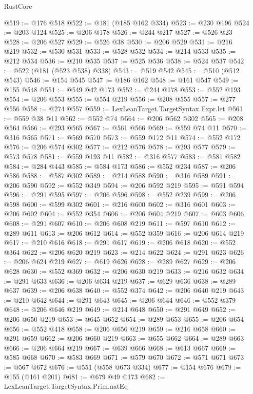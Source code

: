 \begin{lexlean}{RustCore}
\begin{coremodule}
@519 := @176 @518
@522 := @181 (@185 @162 @334)
@523 := @230 @196
@524 := @203 @124
@525 := @206 @178
@526 := @244 @217
@527 := @526 @23
@528 := @206 @527
@529 := @526 @38
@530 := @206 @529
@531 := @216 @219
@532 := @530 @531
@533 := @528 @532
@534 := @214 @533
@535 := @212 @534
@536 := @210 @535
@537 := @525 @536
@538 := @524 @537
@542 := @522 (@181 (@523 @538) @338)
@543 := @519 @542
@545 := @510 (@512 @543)
@546 := @154 @545
@547 := @186 @162
@548 := @161 @547
@549 := @155 @548
@551 := @549 @42 @173
@552 := @244 @178
@553 := @552 @193
@554 := @206 @553
@555 := @554 @219
@556 := @208 @555
@557 := @277 @556
@558 := @274 @557
@559 := LexLeanTarget.TargetSyntax.Expr.let
@561 := @559 @38 @11
@562 := @552 @74
@564 := @206 @562 @302
@565 := @208 @564
@566 := @293 @565
@567 := @561 @566
@569 := @559 @74 @11
@570 := @316 @565
@571 := @569 @570
@573 := @559 @172 @11
@574 := @552 @172
@576 := @206 @574 @302
@577 := @212 @576
@578 := @293 @577
@579 := @573 @578
@581 := @559 @193 @11
@582 := @316 @577
@583 := @581 @582
@584 := @284 @443
@585 := @584 @173
@586 := @552 @234
@587 := @206 @586
@588 := @587 @302
@589 := @214 @588
@590 := @316 @589
@591 := @206 @590
@592 := @552 @349
@594 := @206 @592 @219
@595 := @591 @594
@596 := @291 @595
@597 := @206 @596
@598 := @552 @239
@599 := @206 @598
@600 := @599 @302
@601 := @216 @600
@602 := @316 @601
@603 := @206 @602
@604 := @552 @354
@606 := @206 @604 @219
@607 := @603 @606
@608 := @291 @607
@610 := @206 @608 @219
@611 := @597 @610
@612 := @289 @611
@613 := @206 @612
@614 := @552 @359
@616 := @206 @614 @219
@617 := @210 @616
@618 := @291 @617
@619 := @206 @618
@620 := @552 @364
@622 := @206 @620 @219
@623 := @214 @622
@624 := @291 @623
@626 := @206 @624 @219
@627 := @619 @626
@628 := @289 @627
@629 := @206 @628
@630 := @552 @369
@632 := @206 @630 @219
@633 := @216 @632
@634 := @291 @633
@636 := @206 @634 @219
@637 := @629 @636
@638 := @289 @637
@639 := @206 @638
@640 := @552 @374
@642 := @206 @640 @219
@643 := @210 @642
@644 := @291 @643
@645 := @206 @644
@646 := @552 @379
@648 := @206 @646 @219
@649 := @214 @648
@650 := @291 @649
@652 := @206 @650 @219
@653 := @645 @652
@654 := @289 @653
@655 := @206 @654
@656 := @552 @418
@658 := @206 @656 @219
@659 := @216 @658
@660 := @291 @659
@662 := @206 @660 @219
@663 := @655 @662
@664 := @289 @663
@666 := @206 @664 @219
@667 := @639 @666
@668 := @613 @667
@669 := @585 @668
@670 := @583 @669
@671 := @579 @670
@672 := @571 @671
@673 := @567 @672
@676 := @551 (@558 @673 @334)
@677 := @154 @676
@679 := @155 (@161 @201)
@681 := @679 @49 @173
@682 := LexLeanTarget.TargetSyntax.Prim.natEq

\end{coremodule}
\end{lexlean}
